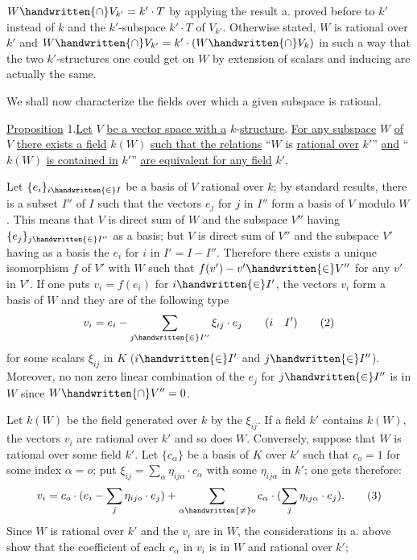 
$W\handwritten{\cap}V_{k'}=k'\cdot T$ by applying the result a. proved before to $k'$ instead of $k$ and the $k'$-subspace $k'\cdot T$ of $V_{k'}$. Otherwise stated, $W$ is rational over $k'$ and $W\handwritten{\cap}V_{k'}=k'\cdot(W\handwritten{\cap}V_k)$ in such a way that the two $k'$-structures one could get on $W$ by extension of scalars and inducing are actually the same.

We shall now characterize the fields over which a given subspace is rational.

\uline{Proposition} 1.\quad \uline{Let} $V$ \uline{be a vector space with a} $k$-\uline{structure}. \uline{For any subspace} $W$ \uline{of} $V$ \uline{there exists a field} $k(W)$ \uline{such that the relations} ``$W$ is \uline{rational over} $k'$'' \uline{and} ``$k(W)$ \uline{is contained in} $k'$'' \uline{are equivalent for any field} $k'$.

Let $\{e_i\}_{i\handwritten{\in}I}$ be a basis of $V$ rational over $k$; by standard results, there is a subset $I''$ of $I$ such that the vectors $e_j$ for $j$ in $I''$ form a basis of $V$ modulo $W$. This means that $V$ is direct sum of $W$ and the subspace $V''$ having $\{e_j\}_{j\handwritten{\in}I''}$ as a basis; but $V$ is direct sum of $V''$ and the subspace $V'$ having as a basis the $e_i$ for $i$ in $I'=I-I''$. Therefore there exists a unique isomorphism $f$ of $V'$ with $W$ such that $f(v')-v'\handwritten{\in}V''$ for any $v'$ in $V'$. If one puts $v_i=f(e_i)$ for $i\handwritten{\in}I'$, the vectors $v_i$ form a basis of $W$ and they are of the following type
\[
v_i=e_i-\sum_{j\handwritten{\in}I''}\xi_{ij}\cdot e_j\qquad(i\quad I')
\tag*{(2)}
\]
for some scalars $\xi_{ij}$ in $K$ ($i\handwritten{\in}I'$ and $j\handwritten{\in}I''$). Moreover, no non zero linear combination of the $e_j$ for $j\handwritten{\in}I''$ is in $W$ since $W\handwritten{\cap}V''=0$.

Let $k(W)$ be the field generated over $k$ by the $\xi_{ij}$. If a field $k'$ contains $k(W)$, the vectors $v_i$ are rational over $k'$ and so does $W$. Conversely, suppose that $W$ is rational over some field $k'$. Let $\{c_\alpha\}$ be a basis of $K$ over $k'$ such that $c_o=1$ for some index $\alpha=o$; put $\xi_{ij}=\sum\limits_\alpha\eta_{ij\alpha}\cdot c_\alpha$ with some $\eta_{ij\alpha}$ in $k'$; one gets therefore:
\[
v_i=c_o\cdot(e_i-\sum_j\eta_{ijo}\cdot e_j)+\sum_{\alpha\handwritten{\ne}o}c_\alpha\cdot(\sum_j\eta_{ij\alpha}\cdot e_j).
\tag*{(3)}
\]
Since $W$ is rational over $k'$ and the $v_i$ are in $W$, the considerations in a. above show that the coefficient of each $c_\alpha$ in $v_i$ is in $W$ and rational over $k'$;

